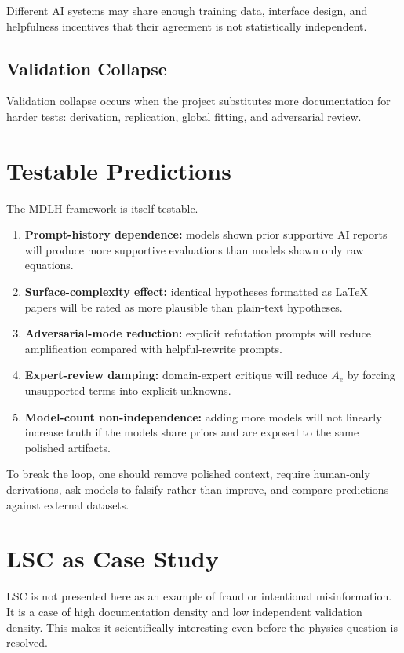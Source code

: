 \documentclass[11pt,a4paper]{article}
\begin{document}
Different AI systems may share enough training data, interface design, and helpfulness incentives that their agreement is not statistically independent.

\subsection{Validation Collapse}

Validation collapse occurs when the project substitutes more documentation for harder tests: derivation, replication, global fitting, and adversarial review.

\section{Testable Predictions}

The MDLH framework is itself testable.

\begin{enumerate}
  \item \textbf{Prompt-history dependence:} models shown prior supportive AI reports will produce more supportive evaluations than models shown only raw equations.
  \item \textbf{Surface-complexity effect:} identical hypotheses formatted as LaTeX papers will be rated as more plausible than plain-text hypotheses.
  \item \textbf{Adversarial-mode reduction:} explicit refutation prompts will reduce amplification compared with helpful-rewrite prompts.
  \item \textbf{Expert-review damping:} domain-expert critique will reduce $A_e$ by forcing unsupported terms into explicit unknowns.
  \item \textbf{Model-count non-independence:} adding more models will not linearly increase truth if the models share priors and are exposed to the same polished artifacts.
\end{enumerate}

To break the loop, one should remove polished context, require human-only derivations, ask models to falsify rather than improve, and compare predictions against external datasets.

\section{LSC as Case Study}

LSC is not presented here as an example of fraud or intentional misinformation. It is a case of high documentation density and low independent validation density. This makes it scientifically interesting even before the physics question is resolved.
\end{document}
